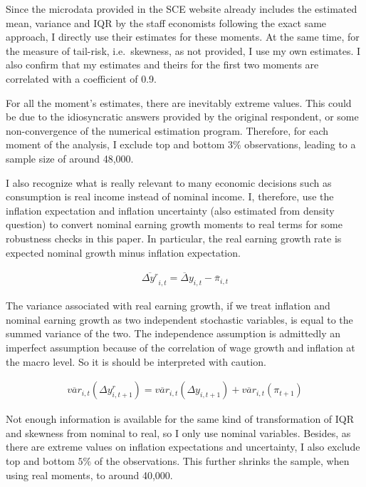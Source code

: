 \documentclass[12pt,notitlepage,onecolumn,aps,pra]{article}
\begin{document}
Since the microdata provided in the SCE website already includes the
estimated mean, variance and IQR by the staff economists following the
exact same approach, I directly use their estimates for these moments.
At the same time, for the measure of tail-risk, i.e.~skewness, as not
provided, I use my own estimates. I also confirm that my estimates and
theirs for the first two moments are correlated with a coefficient of
0.9.

For all the moment's estimates, there are inevitably extreme values.
This could be due to the idiosyncratic answers provided by the original
respondent, or some non-convergence of the numerical estimation program.
Therefore, for each moment of the analysis, I exclude top and bottom
\(3\%\) observations, leading to a sample size of around 48,000.

I also recognize what is really relevant to many economic decisions such
as consumption is real income instead of nominal income. I, therefore,
use the inflation expectation and inflation uncertainty (also estimated
from density question) to convert nominal earning growth moments to real
terms for some robustness checks in this paper. In particular, the real
earning growth rate is expected nominal growth minus inflation
expectation.

\begin{eqnarray}
\overline {\Delta y^{r}}_{i,t} = \overline\Delta y_{i,t} - \overline \pi_{i,t}
\end{eqnarray}

The variance associated with real earning growth, if we treat inflation
and nominal earning growth as two independent stochastic variables, is
equal to the summed variance of the two. The independence assumption is
admittedly an imperfect assumption because of the correlation of wage
growth and inflation at the macro level. So it is should be interpreted
with caution.

\begin{eqnarray}
\overline{var}_{i,t}(\Delta y^r_{i,t+1}) = \overline{var}_{i,t}(\Delta y_{i,t+1}) + \overline{var}_{i,t}(\pi_{t+1})
\end{eqnarray}

Not enough information is available for the same kind of transformation
of IQR and skewness from nominal to real, so I only use nominal
variables. Besides, as there are extreme values on inflation
expectations and uncertainty, I also exclude top and bottom \(5\%\) of
the observations. This further shrinks the sample, when using real
moments, to around 40,000.
\end{document}
